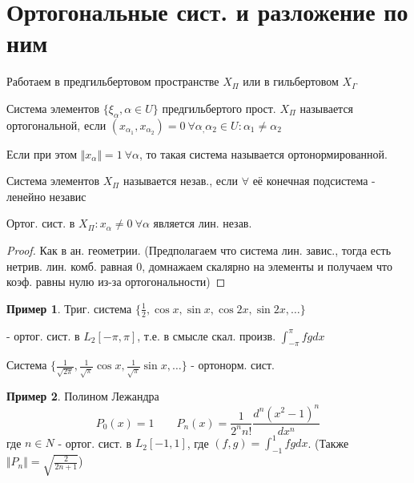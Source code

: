\documentclass{article}
\theoremstyle{definition}
\numberwithin{theorem}{section}
\numberwithin{lemma}{section}
\numberwithin{definition}{section}
\numberwithin{corollary}{section}
\newtheorem*{eg}{Пример}
\numberwithin{equation}{section}
\begin{document}
\section{Ортогональные сист. и разложение по ним}
Работаем в предгильбертовом пространстве $X_{\Pi}$ или в гильбертовом $X_{\Gamma}$
\begin{definition}
Система элементов $\{\xi_{\alpha}, \alpha \in U\}$ предгильбертого прост. $X_{\Pi}$
называется ортогональной, если $(x_{\alpha_1}, x_{\alpha_2})=0 \  \forall \alpha_,\alpha_2 \in U: \alpha_1 \neq \alpha_2$

Если при этом $\Vert x_\alpha \Vert=1 \ \forall \alpha$, то такая система называется ортонормированной.
\end{definition}
\begin{definition}
  Система элементов $X_{\Pi}$ называется незав., если $\forall $ её конечная подсистема
  - ленейно независ
\end{definition}
\begin{lemma}
  Ортог. сист. в $X_{\Pi}: x_\alpha \neq 0 \ \forall \alpha$ является лин. незав. 
\end{lemma}
\begin{proof}
  Как в ан. геометрии. (Предполагаем что система лин. завис., тогда есть нетрив. лин. комб. равная 0, 
  домнажаем скалярно на элементы и получаем что коэф. равны нулю из-за ортогональности)
\end{proof}
\begin{eg}
  Триг. система $\{\frac{1}{2}, \cos x, \sin x, \cos 2x, \sin 2x,\dots \}$ 

  - ортог. сист. в $L_2[-\pi,\pi]$, т.е. в смысле скал. произв. $\int_{-\pi}^{\pi}fgdx$

  Система $\{\frac{1}{\sqrt{2\pi}}, \frac{1}{\sqrt{\pi}}\cos x,\frac{1}{\sqrt{\pi}}\sin x,\dots  \}$ - ортонорм. сист.
\end{eg}
\begin{eg}
  Полином Лежандра
  \[
    P_0(x)=1 \qquad P_n(x)=\frac{1}{2^{n}n!}\frac{d^{n}(x^{2}-1)^{n}}{dx^{n}}
  \]
  где $ n \in N$ - ортог. сист. в $L_2[-1,1]$, где $(f,g)=\int_{-1}^{1}fgdx$. (Также $\Vert P_n \Vert=\sqrt{\frac{2}{2n+1}}$)
\end{eg}
\end{document}
